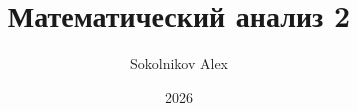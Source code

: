 

\title{\Huge Математический анализ 2}
\author{\huge Sokolnikov Alex}
\date{\LARGE 2026}


    \pagestyle{fancy}
    \maketitle
    \tableofcontents
    \newpage



